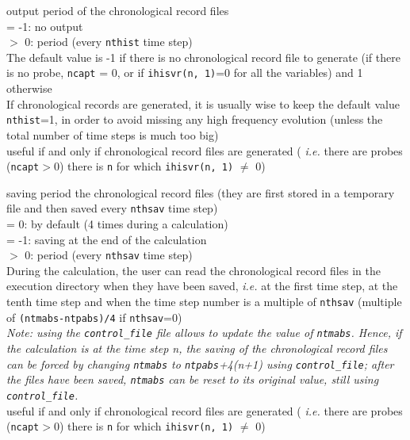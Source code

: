 {output period of the chronological record files\\
\hspace*{1.3cm}= -1: no output\\
\hspace*{1.3cm}$>$ 0: period  (every {\tt nthist} time step)\\
The default value is -1 if there is no chronological record file to
generate (if there is no probe, {\tt ncapt} = 0, or if {\tt ihisvr(n, 1)}=0 for
all the variables) and 1 otherwise\\
If chronological records are generated, it is usually wise to keep the default
value {\tt nthist}=1, in order to avoid missing any high frequency evolution (unless
the total number of time steps is much too big)\\
useful if and only if chronological record files are generated ({\em
i.e.} there are probes ({\tt ncapt}$>$0) there is {\tt n} for which
{\tt ihisvr(n, 1)} $\ne$ 0)}

{saving period the chronological record files (they are first stored in a
temporary file and then saved every {\tt nthsav} time step)\\
\hspace*{1.3cm}= 0: by default (4 times during a calculation)\\
\hspace*{1.3cm}= -1: saving at the end of the calculation\\
\hspace*{1.3cm}$>$ 0: period (every {\tt nthsav} time step)\\
During the calculation, the user can read the chronological record files
in the execution directory when they have been saved, {\em i.e.} at the first
time step, at the tenth time step and when the time step number is a multiple of
{\tt nthsav} (multiple of {\tt (ntmabs-ntpabs)/4} if {\tt nthsav}=0)\\
{\em Note: using the \texttt{control\_file} file allows to update the value of
{\tt ntmabs}. Hence, if the calculation is at the time step n, the saving of the
chronological record files can be forced by changing {\tt ntmabs} to
{\tt ntpabs}+4(n+1)
using \texttt{control\_file}; after the files have been saved, {\tt ntmabs} can be
reset to its original value, still using \texttt{control\_file}.}\\
useful if and only if chronological record files are generated ({\em
i.e.} there are probes ({\tt ncapt}$>$0) there is {\tt n} for which
{\tt ihisvr(n, 1)} $\ne$ 0)}

